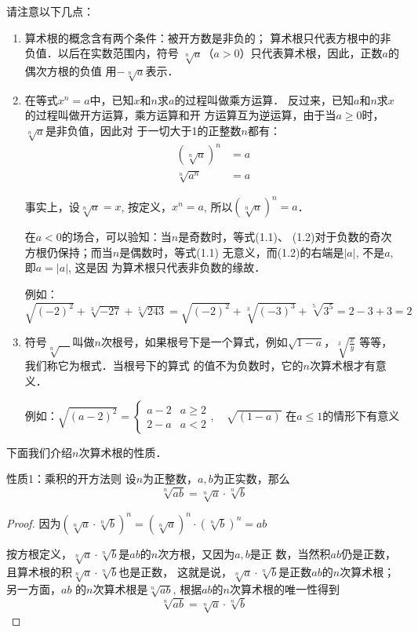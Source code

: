 请注意以下几点：

\begin{enumerate}
    \item 算术根的概念含有两个条件：被开方数是非负的；
算术根只代表方根中的非负值．以后在实数范围内，符号
$\sqrt[n]{a}$（$a>0$）只代表算术根，因此，正数$a$的偶次方根的负值
用$-\sqrt[n]{a}$表示．
\item 在等式$x^n=a$中，已知$x$和$n$求$a$的过程叫做乘方运算．
反过来，已知$a$和$n$求$x$的过程叫做开方运算，乘方运算和开
方运算互为逆运算，由于当$a\ge 0$时，$\sqrt[n]{a}$是非负值，因此对
于一切大于1的正整数$n$都有：
\begin{align}
    \left(\sqrt[n]{a}\right)^n&=a\\
    \sqrt[n]{a^n}&=a
\end{align}

事实上，设$\sqrt[n]{a}=x$, 按定义，$x^n=a$, 所以$\left(\sqrt[n]{a}\right)^n=a$．

在$a<0$的场合，可以验知：当$n$是奇数时，等式(1.1)、
(1.2)对于负数的奇次方根仍保持；而当$n$是偶数时，等式(1.1)
无意义，而(1.2)的右端是$|a|$, 不是$a$, 即$a=|a|$, 这是因
为算术根只代表非负数的缘故．

例如：$\sqrt{(-2)^2}+\sqrt[3]{-27}+\sqrt[5]{243}=\sqrt{(-2)^2}+\sqrt[3]{(-3)^3}+\sqrt[5]{3^5}=2-3+3=2$

\item 符号$\sqrt[n]{\quad }$叫做$n$次根号，如果根号下是一个算式，例如$\sqrt{1-a}$，$\sqrt[3]{\frac{x}{y}}$
等等，我们称它为根式．当根号下的算式
的值不为负数时，它的$n$次算术根才有意义．

例如：$\sqrt{(a-2)^2}=\begin{cases}
    a-2 & a\ge 2\\
    2-a & a<2
\end{cases},\quad \sqrt{(1-a)} \text{ 在$a\le 1$的情形下有意义}$

\end{enumerate}

下面我们介绍$n$次算术根的性质．

\begin{blk}{性质1：乘积的开方法则}
设$n$为正整数，$a,b$为正实数，那么
$$\sqrt[n]{ab}=\sqrt[n]{a}\cdot \sqrt[n]{b}$$
\end{blk}

\begin{proof}
    因为$\left(\sqrt[n]{a}\cdot \sqrt[n]{b}\right)^n=\left(\sqrt[n]{a}\right)^n\cdot \left(\sqrt[n]{b}\right)^n=ab$
    
    按方根定义，$\sqrt[n]{a}\cdot \sqrt[n]{b}$是$ab$的$n$次方根，又因为$a,b$是正
    数，当然积$ab$仍是正数，且算术根的积$\sqrt[n]{a}\cdot \sqrt[n]{b}$也是正数，
    这就是说，$\sqrt[n]{a}\cdot \sqrt[n]{b}$是正数$ab$的$n$次算术根；另一方面，$ab$
    的$n$次算术根是$\sqrt[n]{ab}$, 根据$ab$的$n$次算术根的唯一性得到
    $$\sqrt[n]{ab}=\sqrt[n]{a}\cdot \sqrt[n]{b}$$
\end{proof}

